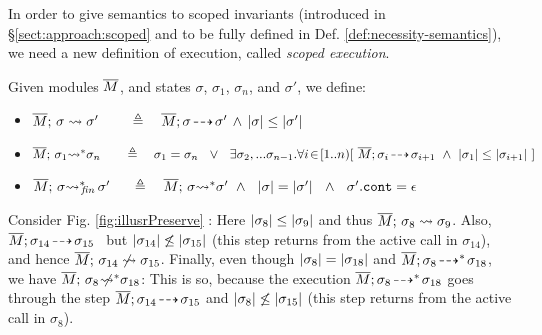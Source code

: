 In order to give semantics to scoped invariants (introduced in \S  \ref{sect:approach:scoped} and to be fully defined  in Def.  \ref{def:necessity-semantics}), we need a new definition of execution, called \emph{scoped execution}. 

 
 \renewcommand{\EarlierS}[2]{\DepthSt{#1} \leq \DepthSt{#2}}
 \renewcommand{\NotEarlierS}[2]{\DepthSt{#1} \not\leq \DepthSt{#2}} 
 
\begin{definition} Given modules $\overline{M}$, and states $\sigma$, $\sigma_1$, $\sigma_n$, and $\sigma'$, we define:
\label{def:shallow:term}
 
\begin{itemize}

  \item
{  $\leadstoBounded  {\Mtwo} {\sigma}   {\sigma'} \ \ \   \,   \ \ \ \triangleq \ \ \  \leadstoOrig {\Mtwo} {\sigma} {\sigma'} \, \wedge\, 
 \EarlierS {\sigma}  {\sigma'} $}
  \item
{  $\leadstoBoundedStar {\Mtwo}  {\sigma_1}  {\sigma_n}  \ \ \,  \ \    \ \triangleq  \ \ \  {\sigma_1} = {\sigma_n}\ \ \vee \ \  \exists \sigma_2,...\sigma_{n-1}.\forall i\!\in\! [1..n)[\  \leadstoOrig {\Mtwo}  {\sigma_i}  {\sigma_{i+1}}\  \wedge\  \EarlierS{\sigma_1} {\sigma_{i+1}} \ ]$ }
\item
  $\leadstoBoundedStarFin {\Mtwo}  {\sigma}  {\sigma'}  \  \,  \ \  \ \triangleq  \ \ \  \leadstoBoundedStar {\Mtwo}  {\sigma}  {\sigma'}  \ \wedge\ \
 {\DepthFs \sigma = \DepthFs {\sigma'} \ \ \wedge \ \ \sigma'.\prg{cont}=\epsilon  } $
 \end{itemize}
\end{definition}


Consider    Fig. \ref{fig:illusrPreserve} :
Here $\EarlierS {\sigma_8} {\sigma_9}$
and thus $\overline{M};\, {\sigma_8} \rightsquigarrow \sigma_9$.
Also,  $\overline{M};\sigma_{14}\! \dashrightarrow\! {\sigma_{15}}$  \
  but  $\NotEarlierS {\sigma_{14}} {\sigma_{15}} $
  (this step returns from the active call in $\sigma_{14}$),
  and hence   $\overline{M};\, {\sigma_{14}} \not\rightsquigarrow \sigma_{15}$. 
Finally, even though $|\sigma_8| = |\sigma_{18}|$
 and $\overline{M};\sigma_8\! \dashrightarrow^*\! {\sigma_{18}}$, we have  
 $\overline{M};\, {\sigma_8} \not\!\!\!{\rightsquigarrow^*} \sigma_{18}$:
This is so, because the execution $\overline{M};\sigma_8\! \dashrightarrow^*\! {\sigma_{18}}$ goes through the step
$\overline{M};\sigma_{14}\! \dashrightarrow\! {\sigma_{15}}$ and  $\NotEarlierS {\sigma_{8}} {\sigma_{15}} $
 (this step returns from the active call in  $\sigma_8$).

